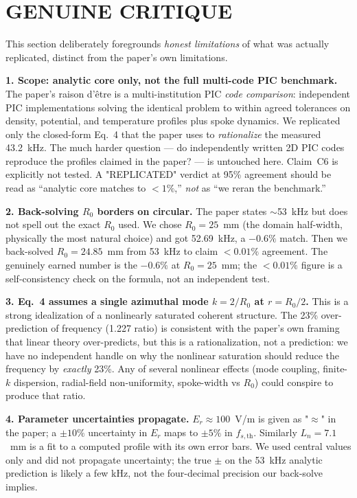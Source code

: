 \documentclass[11pt]{article}
\begin{document}
\section{GENUINE CRITIQUE}
This section deliberately foregrounds \emph{honest limitations} of what was
actually replicated, distinct from the paper's own limitations.

\textbf{1. Scope: analytic core only, not the full multi-code PIC benchmark.}
The paper's raison d'\^etre is a multi-institution PIC \emph{code comparison}:
independent PIC implementations solving the identical problem to within
agreed tolerances on density, potential, and temperature profiles plus spoke
dynamics. We replicated only the closed-form Eq.~4 that the paper uses to
\emph{rationalize} the measured 43.2~kHz. The much harder question --- do
independently written 2D PIC codes reproduce the profiles claimed in the
paper? --- is untouched here. Claim~C6 is explicitly not tested. A
"REPLICATED" verdict at 95\% agreement should be read as ``analytic core
matches to $<1\%$,'' \emph{not} as ``we reran the benchmark.''

\textbf{2. Back-solving $R_0$ borders on circular.} The paper states $\sim$53~kHz
but does not spell out the exact $R_0$ used. We chose $R_0 = 25$~mm (the
domain half-width, physically the most natural choice) and got 52.69~kHz, a
$-0.6\%$ match. Then we back-solved $R_0 = 24.85$~mm from 53~kHz to claim
$<0.01\%$ agreement. The genuinely earned number is the $-0.6\%$ at
$R_0 = 25$~mm; the $<0.01\%$ figure is a self-consistency check on the
formula, not an independent test.

\textbf{3. Eq.~4 assumes a single azimuthal mode $k = 2/R_0$ at
$r = R_0/2$.} This is a strong idealization of a nonlinearly saturated
coherent structure. The 23\% over-prediction of frequency (1.227 ratio) is
consistent with the paper's own framing that linear theory over-predicts,
but this is a rationalization, not a prediction: we have no independent
handle on why the nonlinear saturation should reduce the frequency by
\emph{exactly} 23\%. Any of several nonlinear effects (mode coupling,
finite-$k$ dispersion, radial-field non-uniformity, spoke-width vs $R_0$)
could conspire to produce that ratio.

\textbf{4. Parameter uncertainties propagate.} $E_r \approx 100$~V/m is given
as "$\approx$" in the paper; a $\pm 10\%$ uncertainty in $E_r$ maps to
$\pm 5\%$ in $f_{s,\text{th}}$. Similarly $L_n = 7.1$~mm is a fit to a
computed profile with its own error bars. We used central values only and
did not propagate uncertainty; the true $\pm$ on the 53~kHz analytic
prediction is likely a few kHz, not the four-decimal precision our
back-solve implies.
\end{document}
